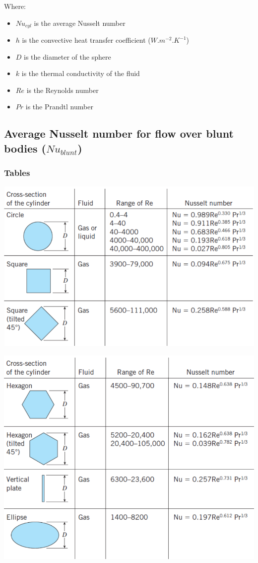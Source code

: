 \documentclass[11pt]{article}
\begin{document}
Where:
\begin{itemize}
\item \(Nu_{cyl}\) is the average Nusselt number
\item \(h\) is the convective heat transfer coefficient (\(\unit{W.m^{-2}.K^{-1}}\))
\item \(D\) is the diameter of the sphere
\item \(k\) is the thermal conductivity of the fluid
\item \(Re\) is the Reynolds number
\item \(Pr\) is the Prandtl number
\end{itemize}

 \newpage

\subsection{Average Nusselt number for flow over blunt bodies (\(Nu_{blunt}\))}
\label{sec:org8c9fb00}

\subsubsection{Tables}
\label{sec:org64289a2}
\begin{center}
\includegraphics[width=.9\linewidth]{./images/average-nusselt-number-blunt-bodies-page-1.png}
\end{center}
\begin{center}
\includegraphics[width=.9\linewidth]{./images/average-nusselt-number-blunt-bodies-page-2.png}
\end{center}
\end{document}
